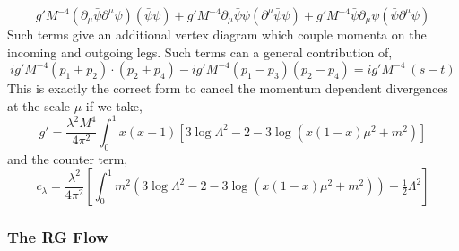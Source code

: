 \documentclass[12pt]{article}
\begin{document}
\[ g' M^{-4} ( \partial_\mu \bar{\psi} \partial^\mu \psi) (\bar{\psi} \psi) +  g' M^{-4} \partial_\mu \bar{\psi} \psi (\partial^\mu \bar{\psi} \psi) + g' M^{-4} \bar{\psi}  \partial_\mu \psi (\bar{\psi} \partial^\mu \psi) \]
Such terms give an additional vertex diagram which   couple momenta on the incoming and outgoing legs. Such terms can a general contribution of,
\[  i g' M^{-4} \left( p_1 + p_2 \right) \cdot \left( p_2 + p_4 \right) - i g' M^{-4} \left( p_1 - p_3 \right) \left( p_2 - p_4 \right) = i g' M^{-4} \: (s - t) \]
This is exactly the correct form to cancel the momentum dependent divergences at the scale $\mu$ if we take,
\[ g' = \frac{\lambda^2 M^4}{4 \pi^2} \int_0^1 x(x  - 1) \left[ 3 \log{\Lambda^2} - 2 - 3 \log{(x(1 - x) \mu^2 + m^2)} \right] \]
and the counter term,
\[ c_{\lambda} = \frac{\lambda^2}{4 \pi^2} \left[ \int_0^1 m^2 \left( 3 \log{\Lambda^2} - 2 - 3 \log{(x(1 - x) \mu^2 + m^2)} \right) - \tfrac{1}{2} \Lambda^2 \right] \]

\subsubsection{The RG Flow}
\end{document}
